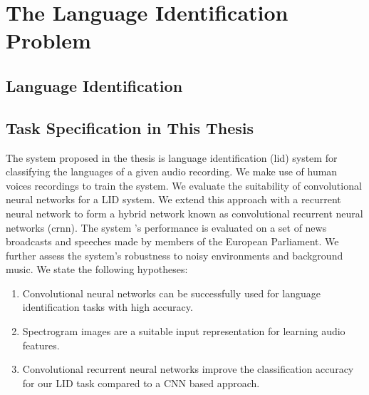 \section{The Language Identification Problem}
\label{sec:lid}

\subsection{Language Identification}


\subsection{Task Specification in This Thesis}
The system proposed in the thesis is language identification (\ac{lid}) system for classifying the languages of a given audio recording. We make use of human voices recordings to train the  system. We evaluate the suitability of convolutional neural networks for a LID system. We extend this approach with a recurrent neural network to form a hybrid network known as convolutional recurrent neural networks (\ac{crnn}). The system 's performance is evaluated on a set of news broadcasts and speeches made by members of the European Parliament. We further assess the system's robustness to noisy environments and background music. We state the following hypotheses:

\begin{enumerate}
	\item Convolutional neural networks can be successfully used for language identification tasks with high accuracy.
	\item Spectrogram images are a suitable input representation for learning audio features.
	\item Convolutional recurrent neural networks improve the classification accuracy for our LID task compared to a CNN based approach.
\end{enumerate}


